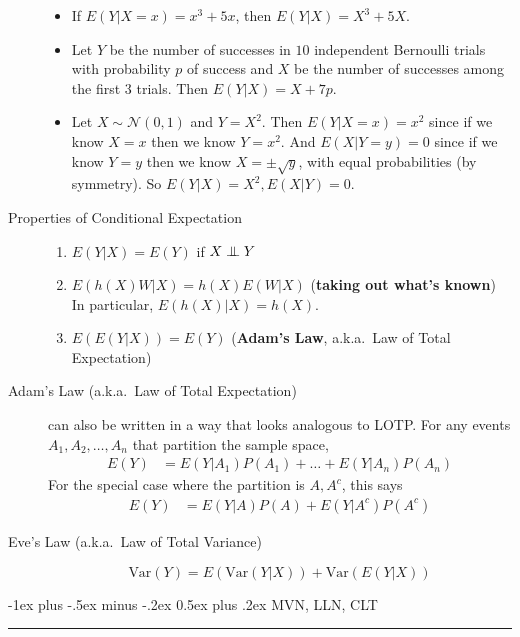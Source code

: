 \documentclass[10pt,landscape]{article}
\makeatletter
\newcommand\independent{\protect\mathpalette{\protect\independenT}{\perp}}
\def\independenT#1#2{\mathrel{\setbox0\hbox{$#1#2$}%
    \copy0\kern-\wd0\mkern4mu\box0}}
\newcommand{\var}{\textrm{Var}}
\newcommand{\N}{\mathcal{N}}
\renewcommand{\section}{\@startsection{section}{1}{0mm}%
                                {-1ex plus -.5ex minus -.2ex}%
                                {0.5ex plus .2ex}%
                                {\normalfont\large\bfseries}}
\makeatother
\begin{document}
\begin{multicols*}{3}
\begin{description}
    \begin{itemize}
    \item If $E(Y|X=x) = x^3+5x$, then $E(Y|X) = X^3 + 5X$.
    \item Let $Y$ be the number of successes in $10$ independent Bernoulli trials with probability $p$ of success and $X$ be the number of successes among the first $3$ trials. Then $E(Y|X)=X+7p$.
    \item Let $X \sim \N(0,1)$ and $Y=X^2$. Then $E(Y|X=x) = x^2$ since if we know $X=x$ then we know $Y=x^2$. And $E(X|Y=y) = 0$ since if we know $Y=y$ then we know $X = \pm \sqrt{y}$, with equal probabilities (by symmetry). So $E(Y|X)=X^2, E(X|Y)=0$.  
    \end{itemize} 
    
        \item[Properties of Conditional Expectation] \quad
    \begin{enumerate}
        \item $E(Y|X) = E(Y)$ if $X \independent Y$
        \item $E(h(X)W|X) = h(X)E(W|X)$ (\textbf{taking out what's known}) \\
        In particular, $E(h(X)|X) = h(X)$.
        \item $E(E(Y|X)) = E(Y)$ (\textbf{Adam's Law}, a.k.a.~Law of Total Expectation)
    \end{enumerate}

    \item[Adam's Law (a.k.a.~Law of Total Expectation)]  can also be written in a way that looks analogous to LOTP. For any events $A_1, A_2, \dots, A_n$ that partition the sample space, 
        \begin{align*}
        E(Y) &= E(Y|A_1)P(A_1) + \dots + E(Y|A_n)P(A_n)
    \end{align*}
    For the special case where the partition is $A, A^c$, this says
        \begin{align*}
            E(Y) &= E(Y|A)P(A) + E(Y|A^c)P(A^c)
    \end{align*}

    \item[Eve's Law (a.k.a.~Law of Total Variance)] \quad
    \[\var(Y) = E(\var(Y|X)) + \var(E(Y|X))\]
\end{description}


\section{MVN, LLN, CLT}\smallskip \hrule height 2pt \smallskip


\end{multicols*}
\end{document}
